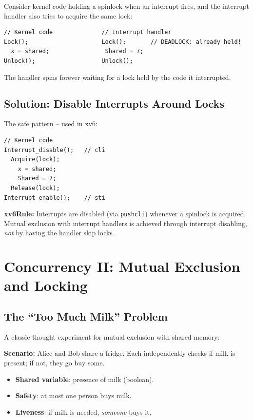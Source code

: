 \documentclass[11pt,a4paper]{article}
\newcommand{\term}[1]{\textbf{#1}}
\newcommand{\code}[1]{\texttt{#1}}
\newcommand{\xv}{xv6}
\begin{document}
Consider kernel code holding a spinlock when an interrupt fires, and the
interrupt handler also tries to acquire the same lock:

\begin{lstlisting}
// Kernel code              // Interrupt handler
Lock();                     Lock();       // DEADLOCK: already held!
  x = shared;                Shared = 7;
Unlock();                   Unlock();
\end{lstlisting}

The handler spins forever waiting for a lock held by the code it interrupted.

\subsection{Solution: Disable Interrupts Around Locks}

The safe pattern -- used in \xv:

\begin{lstlisting}
// Kernel code
Interrupt_disable();   // cli
  Acquire(lock);
    x = shared;
    Shared = 7;
  Release(lock);
Interrupt_enable();    // sti
\end{lstlisting}

\begin{keybox}
\textbf{\xv Rule:} Interrupts are disabled (via \code{pushcli}) whenever a
spinlock is acquired.  Mutual exclusion with interrupt handlers is achieved
through interrupt disabling, \emph{not} by having the handler skip locks.
\end{keybox}

\section{Concurrency II: Mutual Exclusion and Locking}

\subsection{The ``Too Much Milk'' Problem}

A classic thought experiment for mutual exclusion with shared memory:

\textbf{Scenario:} Alice and Bob share a fridge.  Each independently checks
if milk is present; if not, they go buy some.

\begin{itemize}
  \item \term{Shared variable}: presence of milk (boolean).
  \item \term{Safety}: at most one person buys milk.
  \item \term{Liveness}: if milk is needed, \emph{someone} buys it.
\end{itemize}
\end{document}
